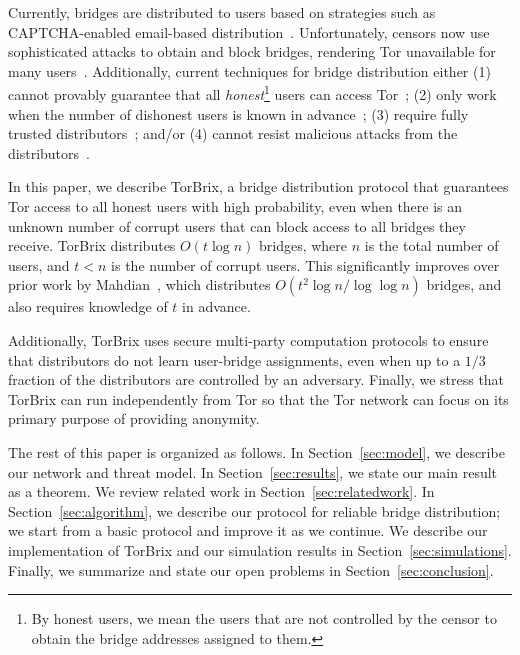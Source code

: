\documentclass{llncs}
\newcommand{\sfsize}{\fontsize{0.73\baselineskip}{0.73\baselineskip}\selectfont}
\newcommand{\sans}[1]{\textsf{\sfsize \mbox{#1}}}
\newcommand{\brix}{\sans{TorBrix}\xspace}
\begin{document}
Currently, bridges are distributed to users based on strategies such as CAPTCHA-enabled email-based distribution~\cite{Dingledine06designof}. Unfortunately, censors now use sophisticated attacks to obtain
and block bridges, rendering Tor unavailable for many users~\cite{Dingledine:Bridges:2011,Ling:2012:infocom,BridgeBlockingChina:2012}.
Additionally, current techniques for bridge distribution either (1) cannot provably guarantee that all \emph{honest}\footnote{By honest users, we mean the users that are not controlled by the censor to obtain the bridge addresses assigned to them.} users can access Tor~\cite{WangLBH:rBridge:13,McCoy:FC:2011,Sovran:2008:PSN}; (2) only work when the number of dishonest users is known in advance~\cite{Mahdian:2010}; (3) require fully trusted distributors~\cite{McCoy:FC:2011,Mahdian:2010,Sovran:2008:PSN}; and/or (4) cannot resist malicious attacks from the distributors~\cite{WangLBH:rBridge:13,McCoy:FC:2011,Mahdian:2010,Sovran:2008:PSN}.

In this paper, we describe \brix, a bridge distribution protocol that guarantees Tor access to all honest users with high probability, even when there is an unknown number of corrupt users that can block access to all bridges they receive.  \brix distributes $O(t\log{n})$ bridges, where $n$ is the total number of users, and ${t < n}$ is the number of corrupt users.  This significantly improves over prior work by Mahdian~\cite{Mahdian:2010}, which distributes $O(t^2\log{n}/\log \log n)$ bridges, and also requires knowledge of $t$ in advance.


Additionally, \brix uses secure multi-party computation protocols to ensure that  distributors do not learn user-bridge assignments, even when up to a $1/3$ fraction of the distributors are controlled by an adversary.  Finally, we stress that \brix can run independently from Tor so that the Tor network can focus on its primary purpose of providing anonymity.

The rest of this paper is organized as follows. In Section~\ref{sec:model}, we describe our network and threat model. In Section~\ref{sec:results}, we state our main result as a theorem. We review related work in Section~\ref{sec:relatedwork}. In Section~\ref{sec:algorithm}, we describe our protocol for reliable bridge distribution; we start from a basic protocol and improve it as we continue. We describe our implementation of \brix and our simulation results in Section~\ref{sec:simulations}. Finally, we summarize and state our open problems in Section~\ref{sec:conclusion}.
\end{document}
